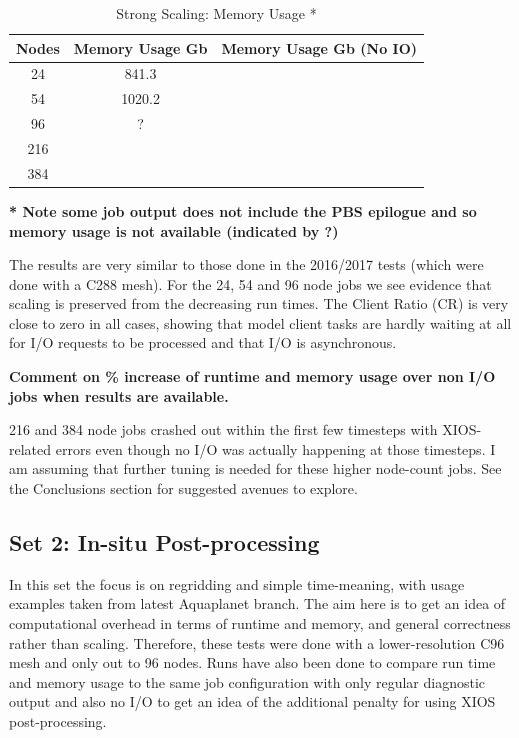 \begin{table}[ht!]
\scriptsize
  \begin{center}
    \caption{Strong Scaling: Memory Usage *}
    \label{tab:table2}
     \begin{tabular}{|c|c|c|}
      \textbf{Nodes} & \textbf{Memory Usage Gb} & \textbf{Memory Usage Gb (No IO)} \\
      \hline
      24 & 841.3 &  \\
      54 & 1020.2  &  \\
      96 & ? &  \\
      216 & & \\
      384 & & \\
    \end{tabular}
  \end{center}
\end{table}

\scriptsize \textbf{* Note some job output does not include the PBS epilogue and so memory usage is not available (indicated by ?)}
\newline

\normalsize
The results are very similar to those done in the 2016/2017 tests (which were done with a C288 mesh). For the 24, 54 and 96 node jobs we see
evidence that scaling is preserved from the decreasing run times. The Client Ratio (CR) is very close to zero in all cases, 
showing that model client tasks are hardly waiting at all for I/O requests to be processed and that I/O is asynchronous.

\textbf{Comment on \% increase of runtime and memory usage over non I/O jobs when results are available.}

216 and 384 node jobs crashed out within the first few timesteps with XIOS-related errors even though no I/O was
actually happening at those timesteps. I am assuming that further tuning is needed for these higher node-count jobs.
See the Conclusions section for suggested avenues to explore.

\subsection{Set 2: In-situ Post-processing}

In this set the focus is on regridding and simple time-meaning, with usage examples taken from latest Aquaplanet branch.
The aim here is to get an idea of computational overhead in terms of runtime and memory, and general correctness rather than scaling.
Therefore, these tests were done with a lower-resolution C96 mesh and only out to 96 nodes.
Runs have also been done to compare run time and memory usage to the same job configuration with only regular diagnostic output and also 
no I/O to get an idea of the additional penalty for using XIOS post-processing. 

